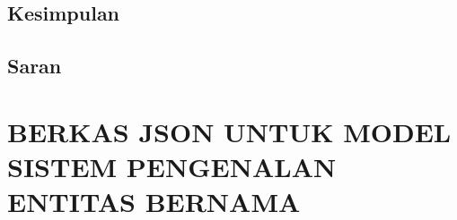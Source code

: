 \documentclass[ugmtesis]{ugmtesis}
\begin{document}
	\section{Kesimpulan}
	\label{penutup kesimpulan}
	

	\section{Saran}
	\label{penutup saran}
	





\appendix

\chapter{BERKAS JSON UNTUK MODEL SISTEM PENGENALAN ENTITAS BERNAMA}
\label{BERKAS JSON UNTUK MODEL SISTEM PENGENALAN ENTITAS BERNAMA}


\end{document}
